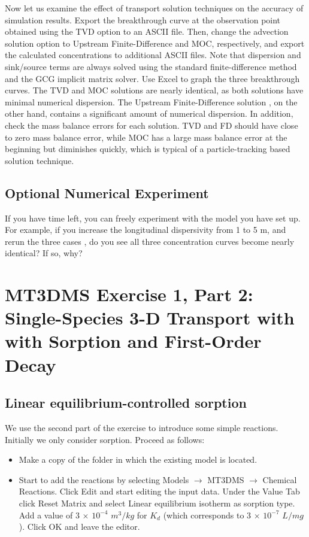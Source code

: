 Now let us examine the effect of transport solution techniques on the accuracy of
simulation results. Export the breakthrough curve at the observation point obtained using
the TVD option to an ASCII file. Then, change the advection solution option to
Upstream Finite-Difference and MOC, respectively, and export the calculated
concentrations to additional ASCII files. Note that dispersion and sink/source terms are
always solved using the standard finite-difference method and the GCG implicit matrix
solver.
Use Excel to graph the three breakthrough curves. 
The TVD 
and MOC 
solutions are
nearly identical, as both solutions have minimal numerical dispersion. The Upstream
Finite-Difference solution 
, on the other hand, contains a significant
amount of numerical dispersion.
In addition, check the mass balance errors for each solution. TVD and FD should have
close to zero mass balance error, while MOC has a large mass balance error at the
beginning but diminishes quickly, which is typical of a particle-tracking based solution
technique.

\subsection{Optional Numerical Experiment}

If you have time left, you can freely experiment with the model you have set up. For
example, if you increase the longitudinal dispersivity from 1 to 5 m, and rerun the 
three cases
, do you see all three concentration curves become nearly identical? 
If so, why?

\section{MT3DMS Exercise 1, Part 2: Single-Species 3-D Transport with with Sorption and First-Order Decay}

\subsection{Linear equilibrium-controlled sorption}

We use the second part of the exercise to introduce some simple reactions.
Initially we only consider sorption. Proceed as follows:

\begin{itemize}

\item Make a copy of the folder in which the existing model is located.

\item Start to add the reactions by selecting Models $\rightarrow$ MT3DMS $\rightarrow$ Chemical Reactions. Click Edit and start editing the input data. Under the Value Tab
click Reset Matrix and select Linear equilibrium isotherm as sorption type.
Add a value of 3 $\times$ $10^{-4}$ $m^3/kg$ for $K_d$ (which corresponds to 3 $\times$ $10^{-7}$ $L/mg$). Click OK and leave the editor.

\end{itemize}

